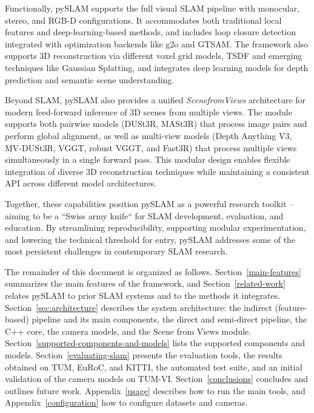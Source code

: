 \documentclass{article}
\begin{document}
Functionally, pySLAM supports the full visual SLAM pipeline with monocular, stereo, and RGB-D configurations. It accommodates both traditional local features and deep-learning-based methods, and includes loop closure detection integrated with optimization backends like g2o\cite{g2o_kummerle} and GTSAM\cite{factor_graphs_for_robot_perception}. The framework also supports 3D reconstruction via different voxel grid models, TSDF\cite{dong2022ash} and emerging techniques like Gaussian Splatting\cite{bao20253d}, and integrates deep learning models for depth prediction and semantic scene understanding.

Beyond SLAM, pySLAM also provides a unified \textit{ScenefromViews} architecture for modern feed-forward inference of 3D scenes from multiple views. The module supports both pairwise models (DUSt3R\cite{wang2023dust3r}, MASt3R\cite{leroy2024grounding}) that process image pairs and perform global alignment, as well as multi-view models (Depth Anything V3\cite{depthanything3}, MV-DUSt3R\cite{tang2025mv}, VGGT\cite{wang2025vggt}, robust VGGT\cite{vggt_robust}, and Fast3R\cite{yang2025fast3r}) that process multiple views simultaneously in a single forward pass. This modular design enables flexible integration of diverse 3D reconstruction techniques while maintaining a consistent API across different model architectures.

Together, these capabilities position pySLAM as a powerful research toolkit -- aiming to be a ``Swiss army knife`` for SLAM development, evaluation, and education. By streamlining reproducibility, supporting modular experimentation, and lowering the technical threshold for entry, pySLAM addresses some of the most persistent challenges in contemporary SLAM research.

The remainder of this document is organized as follows. Section~\ref{main-features} summarizes the main features of the framework, and Section~\ref{related-work} relates pySLAM to prior SLAM systems and to the methods it integrates. Section~\ref{sec:architecture} describes the system architecture: the indirect (feature-based) pipeline and its main components, the direct and semi-direct pipeline, the C++ core, the camera models, and the Scene from Views module. Section~\ref{supported-components-and-models} lists the supported components and models. Section~\ref{evaluating-slam} presents the evaluation tools, the results obtained on TUM, EuRoC, and KITTI, the automated test suite, and an initial validation of the camera models on TUM-VI. Section~\ref{conclusions} concludes and outlines future work. Appendix~\ref{usage} describes how to run the main tools, and Appendix~\ref{configuration} how to configure datasets and cameras.
\end{document}

